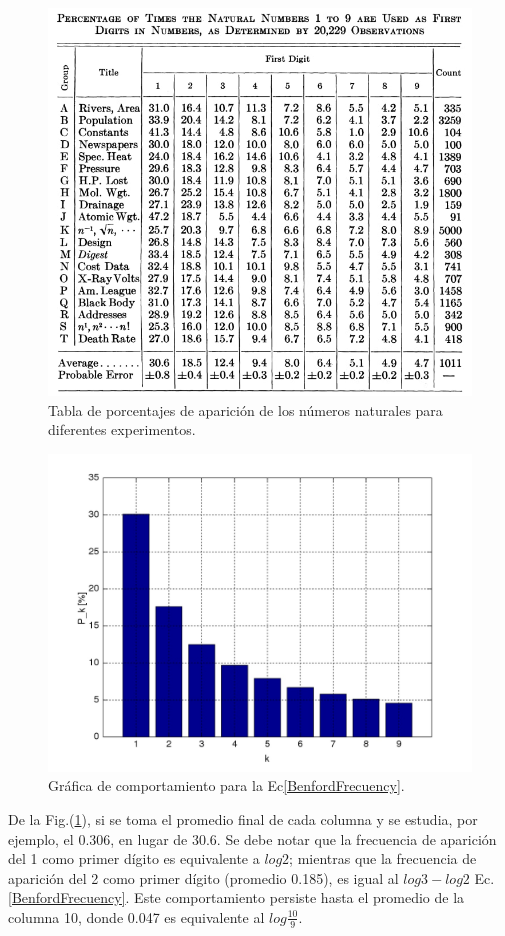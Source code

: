 \begin{figure}[h]
	\centering
	\includegraphics[scale=0.4]{figures/benford_table.jpg}
	\caption{Tabla de porcentajes de aparici\'on de los n\'umeros naturales para diferentes experimentos.}
	\label{T1Benford}
\end{figure}

\begin{figure}[h]
	\centering
	\includegraphics[scale=0.4]{figures/benford_frequency.jpg}
\caption{Gr\'afica de comportamiento para la Ec\eqref{BenfordFrecuency}.}
	\label{G1Benford}
\end{figure}
De la Fig.(\ref{T1Benford}), si se toma el promedio final de cada columna y se
estudia, por ejemplo, el 0.306, en lugar de 30.6. Se debe notar que la
frecuencia de aparici\'on del 1 como primer dígito es equivalente a $log 2$;
mientras que la frecuencia de aparici\'on del 2 como primer d\'igito (promedio
0.185), es igual al $log 3-log 2$ Ec.\eqref{BenfordFrecuency}. Este
comportamiento persiste hasta el promedio de la columna 10, donde 0.047 es
equivalente al $log \frac{10}{9}$.


